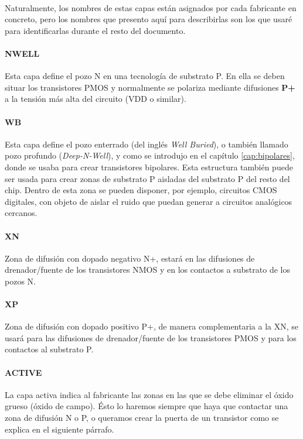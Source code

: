 \paragraph{}
Naturalmente, los nombres de estas capas están asignados por cada fabricante en
concreto, pero los nombres que presento aquí para describirlas son los que usaré
para identificarlas durante el resto del documento.

\paragraph{NWELL}
Esta capa define el pozo N en una tecnología de substrato P. En ella se deben
situar los transistores PMOS y normalmente se polariza mediante difusiones \textbf{P+}
a la tensión más alta del circuito (VDD o similar).

\paragraph{WB}
Esta capa define el pozo enterrado (del inglés \textit{Well Buried}), o también
llamado pozo profundo (\textit{Deep-N-Well}), y como se introdujo en el capítulo
\ref{cap:bipolares}, donde se usaba para crear transistores bipolares. Esta
estructura también puede ser usada para crear zonas de substrato P aisladas del substrato
P del resto del chip. Dentro de esta zona se pueden disponer, por ejemplo, circuitos
CMOS digitales, con objeto de aislar el ruido que puedan generar a circuitos analógicos
cercanos.

\paragraph{XN}
Zona de difusión con dopado negativo N+, estará en las difusiones de drenador/fuente
de los transistores NMOS y en los contactos a substrato de los pozos N.

\paragraph{XP}
Zona de difusión con dopado positivo P+, de manera complementaria a la XN,
se usará para las difusiones de drenador/fuente
de los transistores PMOS y para los contactos al substrato P.

\paragraph{ACTIVE}
La capa activa indica al fabricante las zonas en las que se debe eliminar el óxido grueso (óxido
de campo). Ésto lo haremos siempre que haya que contactar una zona de difusión N o P,
o queramos crear la puerta de un transistor como se explica en el siguiente párrafo.

